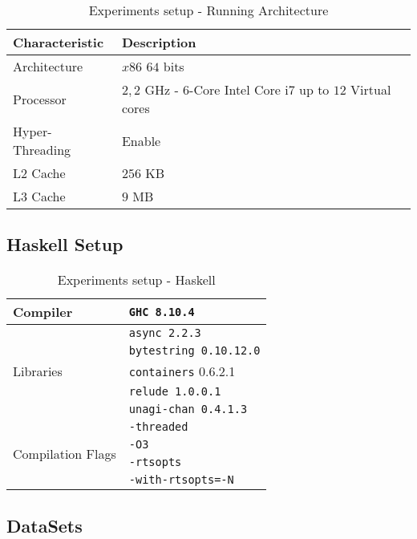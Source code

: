 \documentclass[preprint]{elsarticle}
\begin{document}
\begin{table}[H]
  \centering
  \begin{tabular}{|l|l|}
   \hline
   \textbf{Characteristic} & \textbf{Description} \\
   \hline
   Architecture & $x86$ $64$ bits  \\
   \hline
   Processor & $2,2$ GHz - $6$-Core Intel Core i7 up to $12$ Virtual cores \\
   \hline
   Hyper-Threading & Enable \\
   \hline
    L2 Cache & $256$ KB\\
    \hline
    L3 Cache & $9$ MB\\
    \hline
  \end{tabular}
 \caption{Experiments setup - Running Architecture}
 \label{run:arch}
 \end{table}

\subsection{\textbf{Haskell Setup}}

\begin{table}[H]
  \centering
  \begin{tabular}{|l|l|}
   \hline
   Compiler & \texttt{GHC 8.10.4}  \\
   \hline
   \multirow{5}{5em}{Libraries} & \texttt{async 2.2.3} \\ 
   & \texttt{bytestring 0.10.12.0} \\
   & \texttt{containers} 0.6.2.1 \\
   & \texttt{relude 1.0.0.1} \\
   & \texttt{unagi-chan 0.4.1.3}\\
   \hline
   \multirow{4}{7em}{Compilation Flags} & \texttt{-threaded}\\
   & \texttt{-O3}\\
   & \texttt{-rtsopts}\\
   & \texttt{-with-rtsopts=-N}\\
   \hline
  \end{tabular}
 \caption{Experiments setup - Haskell}
 \label{haskell:setup}
 \end{table}
 
\subsection{\textbf{DataSets}}\label{data:set}
\end{document}

